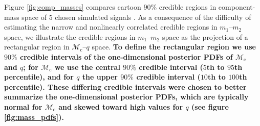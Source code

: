 Figure \ref{fig:comp_masses} compares cartoon $90\%$ credible regions in component-mass space of $5$ chosen simulated signals \citep[cf.][figure 1]{Chatziioannou_2014}.  As a consequence of the difficulty of estimating the narrow and nonlinearly correlated credible regions in $m_1$--$m_2$ space, we illustrate the credible regions in $m_1$--$m_2$ space as the projection of a rectangular region in $\mathcal{M}_\mathrm{c}$--$q$ space.  \textbf{To define the rectangular region we use $90\%$ credible intervals of the one-dimensional posterior PDFs of $\mathcal{M}_\mathrm{c}$ and $q$; for $\mathcal{M}_\mathrm{c}$ we use the central $90\%$ credible interval ($5$th to $95$th percentile), and for $q$ the upper $90\%$ credible interval ($10$th to $100$th percentile).  These differing credible intervals were chosen to better summarize the one-dimensional posterior PDFs, which are typically normal for $\mathcal{M}_\mathrm{c}$ and skewed toward high values for $q$ (see figure \ref{fig:mass_pdfs}).}